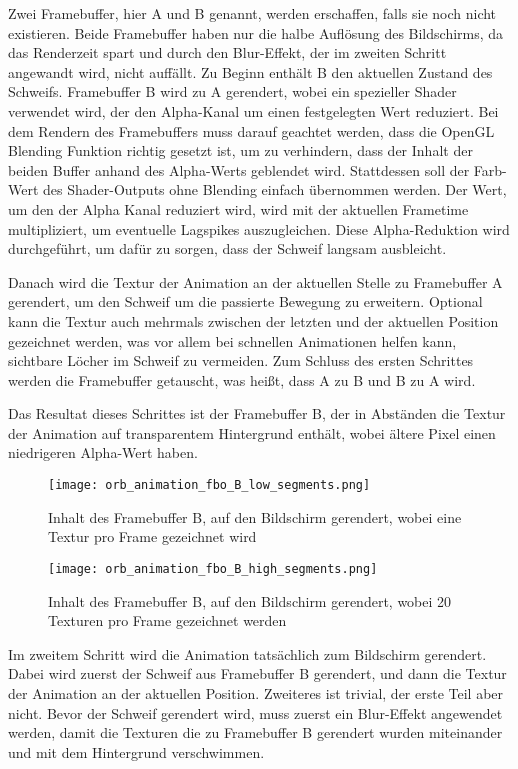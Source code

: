 Zwei Framebuffer, hier A und B genannt, werden erschaffen, falls sie noch nicht existieren.
Beide Framebuffer haben nur die halbe Auflösung des Bildschirms, da das Renderzeit spart und durch den Blur-Effekt, der
im zweiten Schritt angewandt wird, nicht auffällt.
Zu Beginn enthält B den aktuellen Zustand des Schweifs.
Framebuffer B wird zu A gerendert, wobei ein spezieller Shader verwendet wird, der den Alpha-Kanal um einen festgelegten
Wert reduziert.
Bei dem Rendern des Framebuffers muss darauf geachtet werden, dass die OpenGL Blending Funktion richtig gesetzt ist,
um zu verhindern, dass der Inhalt der beiden Buffer anhand des Alpha-Werts geblendet wird.
Stattdessen soll der Farb-Wert des Shader-Outputs ohne Blending einfach übernommen werden.
Der Wert, um den der Alpha Kanal reduziert wird, wird mit der aktuellen Frametime multipliziert, um eventuelle
Lagspikes auszugleichen.
Diese Alpha-Reduktion wird durchgeführt, um dafür zu sorgen, dass der Schweif langsam ausbleicht.

Danach wird die Textur der Animation an der aktuellen Stelle zu Framebuffer A gerendert, um den Schweif um die passierte
Bewegung zu erweitern.
Optional kann die Textur auch mehrmals zwischen der letzten und der aktuellen Position gezeichnet werden, was vor allem
bei schnellen Animationen helfen kann, sichtbare Löcher im Schweif zu vermeiden.
Zum Schluss des ersten Schrittes werden die Framebuffer getauscht, was heißt, dass A zu B und B zu A wird.

Das Resultat dieses Schrittes ist der Framebuffer B, der in Abständen die Textur der Animation auf transparentem
Hintergrund enthält, wobei ältere Pixel einen niedrigeren Alpha-Wert haben.

\begin{figure}[H]
    \centering
    \texttt{[image: orb\_animation\_fbo\_B\_low\_segments.png]}
    \caption{Inhalt des Framebuffer B, auf den Bildschirm gerendert, wobei eine Textur pro Frame gezeichnet wird }
\end{figure}

\begin{figure}[H]
    \centering
    \texttt{[image: orb\_animation\_fbo\_B\_high\_segments.png]}
    \caption{Inhalt des Framebuffer B, auf den Bildschirm gerendert, wobei 20 Texturen pro Frame gezeichnet werden }
\end{figure}

Im zweitem Schritt wird die Animation tatsächlich zum Bildschirm gerendert.
Dabei wird zuerst der Schweif aus Framebuffer B gerendert, und dann die Textur der Animation an der aktuellen Position.
Zweiteres ist trivial, der erste Teil aber nicht.
Bevor der Schweif gerendert wird, muss zuerst ein Blur-Effekt angewendet werden, damit die Texturen die zu Framebuffer
B gerendert wurden miteinander und mit dem Hintergrund verschwimmen.

